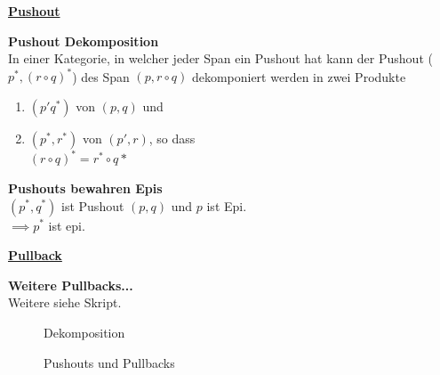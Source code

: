 \begin{multicols}{2}

\textbf{\underline{Pushout}} 

\textbf{ Pushout Dekomposition} \\
In einer Kategorie, in welcher jeder Span ein Pushout hat kann der Pushout ($p^*, (r \circ q)^*$) des Span $(p, r \circ q)$ dekomponiert werden in zwei Produkte 
\begin{enumerate}
\item $(p' q^*)$ von $(p,q)$ und 
\item $(p^*, r^*)$ von $(p', r)$, so dass \\ $(r \circ q)^* = r^* \circ q*$
\end{enumerate}

\textbf{ Pushouts bewahren Epis} \\
$(p^*, q^*)$ ist Pushout $(p,q)$ und $p$ ist Epi.\\
$\implies p^*$ ist epi.


\columnbreak

\textbf{\underline{Pullback}} 

\textbf{Weitere Pullbacks...} \\
Weitere siehe Skript.

\end{multicols}

\begin{figure}[h]
\centering
{} \qquad \qquad \qquad
{}
\caption{Dekomposition}
\end{figure}

\begin{figure}[h]
\centering
{} \qquad \qquad \qquad
{}
\caption{Pushouts und Pullbacks}
\end{figure}


